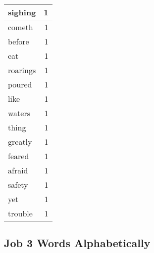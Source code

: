 \begin{center}
\begin{longtable}{l|r}
sighing & 1\\ \hline 
cometh & 1\\ \hline 
before & 1\\ \hline 
eat & 1\\ \hline 
roarings & 1\\ \hline 
poured & 1\\ \hline 
like & 1\\ \hline 
waters & 1\\ \hline 
thing & 1\\ \hline 
greatly & 1\\ \hline 
feared & 1\\ \hline 
afraid & 1\\ \hline 
safety & 1\\ \hline 
yet & 1\\ \hline 
trouble & 1\\ \hline 
\end{longtable}
\end{center}





\subsection{Job 3 Words Alphabetically}


\normalsize
 
